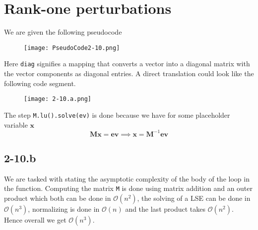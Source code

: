 \documentclass{article}
\begin{document}
\section*{Rank-one perturbations}
We are given the following pseudocode 
\begin{figure}[!hbt]
    \centering
\texttt{[image: PseudoCode2-10.png]}
\end{figure}
Here \verb|diag| signifies a mapping that converts a vector into a diagonal matrix with the vector components as diagonal entries. A direct translation could look like the following code segment.
\begin{figure}[!hbt]
    \centering
\texttt{[image: 2-10.a.png]}
\end{figure}
The step \verb|M.lu().solve(ev)| is done because we have for some placeholder variable $\mathbf{x}$
\begin{equation*}
    \mathbf{M}\mathbf{x} = \mathbf{ev} \implies \mathbf{x} = \mathbf{M}^{-1}\mathbf{ev}
\end{equation*}
\subsection*{2-10.b}
We are tasked with stating the asymptotic complexity of the body of the loop in the function. Computing the matrix \verb|M| is done using matrix addition and an outer product which both can be done in $\mathcal{O}\left(n^{2}\right)$, the solving of a LSE can be done in $\mathcal{O}\left(n^{3}\right)$, normalizing is done in $\mathcal{O}\left(n\right)$ and the last product takes $\mathcal{O}\left(n^{2}\right)$. Hence overall we get $\mathcal{O}\left(n^{3}\right)$.
\end{document}
